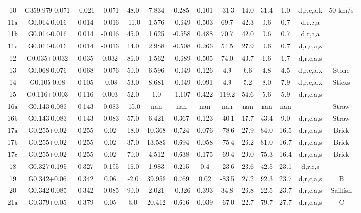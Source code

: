\begin{table}
\begin{tabular}{cccccccccccccc}
10 & G359.979-0.071 & -0.021 & -0.071 & 48.0 & 7.834 & 0.285 & 0.101 & -31.3 & 14.0 & 31.4 & 1.0 & d,r,c,a,k & 50 km/s \\
11a & G0.014-0.016 & 0.014 & -0.016 & -11.0 & 1.576 & -0.649 & 0.503 & 69.7 & 42.3 & 0.6 & 0.7 & d,r,c,a &  \\
11b & G0.014-0.016 & 0.014 & -0.016 & 45.0 & 1.625 & -0.658 & 0.488 & 70.7 & 42.0 & 0.6 & 0.7 & d,r,c,a &  \\
11c & G0.014-0.016 & 0.014 & -0.016 & 14.0 & 2.988 & -0.508 & 0.266 & 54.5 & 27.9 & 0.6 & 0.7 & d,r,c,a,s &  \\
12 & G0.035+0.032 & 0.035 & 0.032 & 86.0 & 1.562 & -0.689 & 0.505 & 74.0 & 43.7 & 1.6 & 1.7 & d,r,c,a,s &  \\
13 & G0.068-0.076 & 0.068 & -0.076 & 50.0 & 6.596 & -0.049 & 0.126 & 4.9 & 6.6 & 4.8 & 4.5 & d,r,c,a,x & Stone \\
14 & G0.105-0.08 & 0.105 & -0.08 & 53.0 & 8.681 & -0.049 & 0.091 & 4.9 & 5.2 & 8.0 & 7.9 & d,r,c,a,x & Sticks \\
15 & G0.116+0.003 & 0.116 & 0.003 & 52.0 & 1.0 & -1.107 & 0.422 & 119.2 & 54.6 & 5.6 & 5.9 & d,r,c,a,s &  \\
16a & G0.143-0.083 & 0.143 & -0.083 & -15.0 & nan & nan & nan & nan & nan & nan & nan &  & Straw \\
16b & G0.143-0.083 & 0.143 & -0.083 & 57.0 & 6.421 & 0.367 & 0.123 & -40.1 & 17.7 & 43.4 & 9.0 & d,r,c,a,s & Straw \\
17a & G0.255+0.02 & 0.255 & 0.02 & 18.0 & 10.368 & 0.724 & 0.076 & -78.6 & 27.9 & 84.0 & 16.5 & d,r,c,a,s & Brick \\
17b & G0.255+0.02 & 0.255 & 0.02 & 37.0 & 13.585 & 0.694 & 0.058 & -75.4 & 26.2 & 81.0 & 16.7 & d,r,c,a,s & Brick \\
17c & G0.255+0.02 & 0.255 & 0.02 & 70.0 & 4.512 & 0.638 & 0.175 & -69.4 & 29.0 & 75.3 & 16.4 & d,r,c,a,s & Brick \\
18 & G0.327-0.195 & 0.327 & -0.195 & 16.0 & 1.983 & 0.215 & 0.4 & -23.6 & 23.6 & 42.5 & 23.1 & d,r,c,s &  \\
19 & G0.342+0.06 & 0.342 & 0.06 & -2.0 & 39.958 & 0.769 & 0.02 & -83.5 & 27.2 & 92.3 & 23.7 & d,r,c,a,s & B \\
20 & G0.342-0.085 & 0.342 & -0.085 & 90.0 & 2.021 & -0.326 & 0.393 & 34.8 & 26.8 & 22.5 & 23.7 & d,r,c,a,s & Sailfish \\
21a & G0.379+0.05 & 0.379 & 0.05 & 8.0 & 20.412 & 0.616 & 0.039 & -67.0 & 22.7 & 79.7 & 27.7 & d,r,c,a,s & C \\

\end{tabular}
\end{table}
